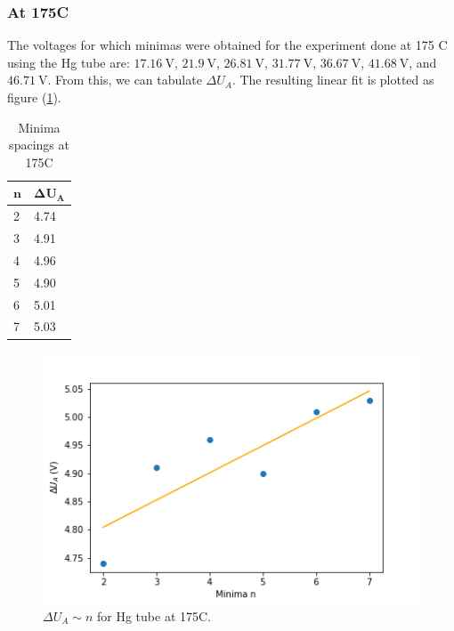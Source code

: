 \documentclass[%
 reprint,
 amsmath,amssymb,
 aps,
]{revtex4-2}
\begin{document}
        \subsubsection{At 175\degree C}
            The voltages for which minimas were obtained for the experiment done at 175 \degree C using the Hg tube are: $\SI{17.16}{\volt}$, $\SI{21.9}{\volt}$, $\SI{26.81}{\volt}$, $\SI{31.77}{\volt}$, $\SI{36.67}{\volt}$, $\SI{41.68}{\volt}$, and $\SI{46.71}{\volt}$.
            From this, we can tabulate $\Delta U_A$. The resulting linear fit is plotted as figure (\ref{fig:175HgMS}). 
            \begin{table}[h!]
            \caption{Minima spacings at 175\degree C}
            \begin{tabular}{|m{1cm}|m{2cm}|}
            \hline
            \hfil $\bm{n}$ & \hfil $\bm{\Delta U_A}$ \\ \hline \hline
            \hfil 2 & \hfil 4.74 \\ \hline
            \hfil 3 & \hfil 4.91 \\ \hline
            \hfil 4 & \hfil 4.96 \\ \hline
            \hfil 5 & \hfil 4.90 \\ \hline
            \hfil 6 & \hfil 5.01 \\ \hline
            \hfil 7 & \hfil 5.03 \\ \hline
            \end{tabular}
            \label{Tab:175Hg}
            \end{table}
            \begin{figure}[]
                \centering
                \includegraphics[scale = 0.5]{Figures/175HgMS.png}
                \caption{$\Delta U_A \sim n$ for Hg tube at 175\degree C.}
                \label{fig:175HgMS}
            \end{figure}
\end{document}
